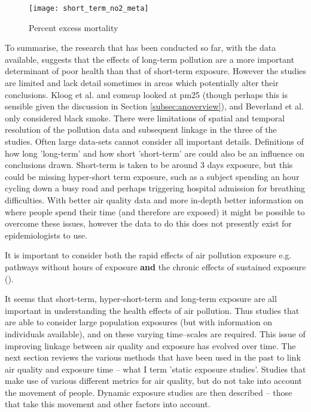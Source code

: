 \begin{figure}[H]
\centering
\texttt{[image: short\_term\_no2\_meta]}
\caption{Percent excess mortality}
\label{fig:short_term_no2_meta}
\end{figure}

To summarise, the research that has been conducted so far, with the data available, suggests that the effects of long-term pollution are a more important determinant of poor health than that of short-term exposure. However the studies are limited and lack detail sometimes in areas which potentially alter their conclusions. Kloog et al. and \gls{comeap} looked at \gls{pm25} (though perhaps this is sensible given the discussion in Section \ref{subsec:anoverview}), and Beverland et al. only considered black smoke. There were limitations of spatial and temporal resolution of the pollution data and subsequent linkage in the three of the studies. Often large data-sets cannot consider all important details. Definitions of how long 'long-term' and how short 'short-term' are could also be an influence on conclusions drawn. Short-term is taken to be around 3 days exposure, but this could be missing hyper-short term exposure, such as a subject spending an hour cycling down a busy road and perhaps triggering hospital admission for breathing difficulties. With better air quality data and more in-depth better information on where people spend their time (and therefore are exposed) it might be possible to overcome these issues, however the data to do this does not presently exist for epidemiologists to use.

It is important to consider both the rapid effects of air pollution exposure e.g. pathways without hours of exposure \textbf{and} the chronic effects of sustained exposure (\cite{Brook2010}).

It seems that short-term, hyper-short-term and long-term exposure are all important in understanding the health effects of air pollution. Thus studies that are able to consider large population exposures (but with information on individuals available), and on these varying time--scales are required. This issue of improving linkage between air quality and exposure has evolved over time. The next section reviews the various methods that have been used in the past to link air quality and exposure time -- what I term 'static exposure studies'. Studies that make use of various different metrics for air quality, but do not take into account the movement of people. Dynamic exposure studies are then described -- those that take this movement and other factors into account.

